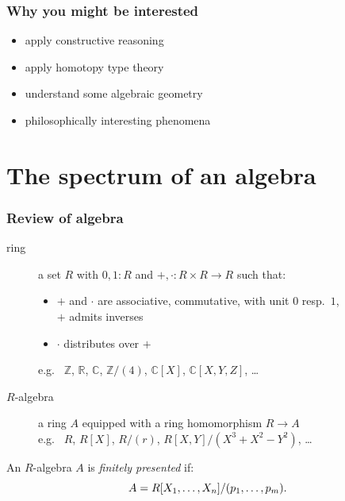 \documentclass[aspectratio=1610]{beamer}
\begin{document}
\begin{frame}
  \frametitle{Why \alert{you} might be interested}

  \begin{itemize}
    \item
      apply constructive reasoning
    \item
      apply homotopy type theory
    \item
      understand some algebraic geometry
    \item
      philosophically interesting phenomena
  \end{itemize}

  \bigskip
  \bigskip
\end{frame}

\section{The spectrum of an algebra}

\begin{frame}
  \frametitle{Review of algebra}

  \begin{description}
    \item[ring]
      a set $R$ with $0, 1 : R$ and ${+}, {\cdot} : R \times R \to R$ such that:
      \begin{itemize}
        \item
          $+$ and $\cdot$ are associative, commutative, with unit $0$ resp.\ $1$,\\
          $+$ admits inverses
        \item
          $\cdot$ distributes over $+$
      \end{itemize}
      {
      e.g.\ %
      $\mathbb{Z}$,
      $\mathbb{R}$,
      $\mathbb{C}$,
      $\mathbb{Z}/(4)$,
      $\mathbb{C}[X]$,
      $\mathbb{C}[X, Y, Z]$,
      \dots}
      \pause%
    \bigskip
    \item[$R$-algebra]
      a ring $A$ equipped with a ring homomorphism $R \to A$\\
      {
      e.g.\ %
      $R$,
      $R[X]$,
      $R/(r)$,
      $R[X, Y]/(X^3 + X^2 - Y^2)$,
      \dots}
  \end{description}

  \pause%
  \bigskip
  \bigskip
  An $R$-algebra $A$ is \emph{finitely presented} if:
  \[ A = R[X_1, \dots, X_n]/(p_1, \dots, p_m) \rlap{.}\]
\end{frame}
\end{document}
